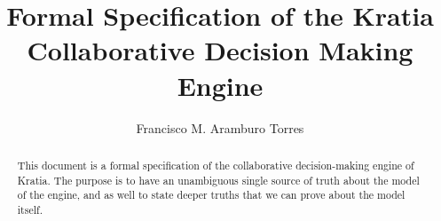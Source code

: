%
\title{Formal Specification of the Kratia Collaborative Decision Making Engine}
%
%
\author{Francisco M. Aramburo Torres}
%
%

\maketitle              %

\begin{abstract}

This document is a formal specification of the collaborative decision-making engine of Kratia. The purpose is to have
an unambiguous single source of truth about the model of the engine, and as well to state deeper truths that we can prove about the model itself.

\end{abstract}